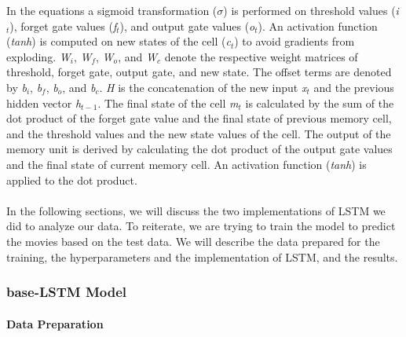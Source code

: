 In the equations a sigmoid transformation ($\sigma$) is performed on threshold values (\textit{i$_{t}$}), forget gate values (\textit{f$_{t}$}), and output gate values (\textit{o$_{t}$}). An activation function (\textit{tanh}) is computed on new states of the cell (\textit{c$_{t}$}) to avoid gradients from exploding. \textit{W$_{i}$}, \textit{W$_{f}$}, \textit{W$_{o}$}, and \textit{W$_{c}$} denote the respective weight matrices of threshold, forget gate, output gate, and new state. The offset terms are denoted by \textit{b$_{i}$}, \textit{b$_{f}$}, \textit{b$_{o}$}, and \textit{b$_{c}$}.  \textit{H} is the concatenation of the new input \textit{x$_{t}$} and the previous hidden vector \textit{h$_{t-1}$}. The final state of the cell \textit{m$_{t}$} is calculated by the sum of the dot product of the forget gate value and the final state of previous memory cell, and the threshold values and the new state values of the cell. The output of the memory unit is derived by calculating the dot product of the output gate values and the final state of current memory cell. An activation function (\textit{tanh}) is applied to the dot product. 

\paragraph{} In the following sections, we will discuss the two implementations of LSTM we did to analyze our data. To reiterate, we are trying to train the model to predict the movies based on the test data. We will describe the data prepared for the training, the hyperparameters and the implementation of LSTM, and the results.

\subsubsection{base-LSTM Model}
\label{sec:lstm_base_model}
\paragraph{Data Preparation}


